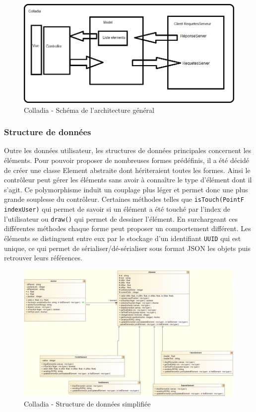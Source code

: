  	\vspace*{\fill}
	\begin{figure}[!h]
		\centering
		\includegraphics[width=.6\textwidth]{img/archiGeneral}
		\caption{Colladia - Schéma de l'architecture général}
	\end{figure}
 	\vspace*{\fill}
	
\newpage
\subsubsection{Structure de données}
Outre les données utilisateur, les structures de données principales concernent les éléments.
Pour pouvoir proposer de nombreuses formes prédéfinis, il a été décidé de créer une classe Element abstraite dont hériteraient toutes les formes.
Ainsi le contrôleur peut gérer les éléments sans avoir à connaître le type d'élément dont il s'agit.
Ce polymorphisme induit un couplage plus léger et permet donc une plus grande souplesse du contrôleur.
Certaines méthodes telles que \lstinline$isTouch(PointF indexUser)$ qui permet de savoir si un élément a été touché par l'index de l'utilisateur ou \lstinline$draw()$ qui permet de dessiner l'élément.
En surchargeant ces différentes méthodes chaque forme peut proposer un comportement différent.
Les éléments se distinguent entre eux par le stockage d'un identifiant \lstinline$UUID$ qui est unique, ce qui permet de sérialiser/dé-sérialiser sous format JSON les objets puis retrouver leurs références. 

	\vspace*{\fill}
	\begin{figure}[!h]
		\centering
		\includegraphics[width=\textwidth]{img/UmlArchiStructureData}
		\caption{Colladia - Structure de données simplifiée}
	\end{figure}
	\vspace*{\fill}
	
